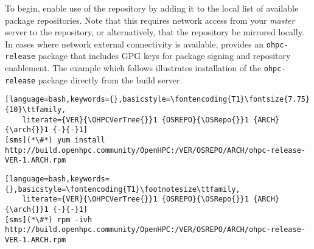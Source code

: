 To begin, enable use of the \OHPC{} repository by adding it to the local list
of available package repositories. Note that this requires network access from
your {\em master} server to the \OHPC{} repository, or alternatively, that
the \OHPC{} repository be mirrored locally.  In cases where network external
connectivity is available, \OHPC{} provides an \texttt{ohpc-release} package
that includes GPG keys for package signing and repository enablement.  The
example which follows illustrates installation of the \texttt{ohpc-release}
package directly from the \OHPC{} build server.

\begin{lstlisting}[language=bash,keywords={},basicstyle=\fontencoding{T1}\fontsize{7.75}{10}\ttfamily,
	literate={VER}{\OHPCVerTree{}}1 {OSREPO}{\OSRepo{}}1 {ARCH}{\arch{}}1 {-}{-}1]
[sms](*\#*) yum install http://build.openhpc.community/OpenHPC:/VER/OSREPO/ARCH/ohpc-release-VER-1.ARCH.rpm
\end{lstlisting}
\else
\begin{lstlisting}[language=bash,keywords={},basicstyle=\fontencoding{T1}\footnotesize\ttfamily,
	literate={VER}{\OHPCVerTree{}}1 {OSREPO}{\OSRepo{}}1 {ARCH}{\arch{}}1 {-}{-}1]
[sms](*\#*) rpm -ivh http://build.openhpc.community/OpenHPC:/VER/OSREPO/ARCH/ohpc-release-VER-1.ARCH.rpm
\end{lstlisting}
\fi







